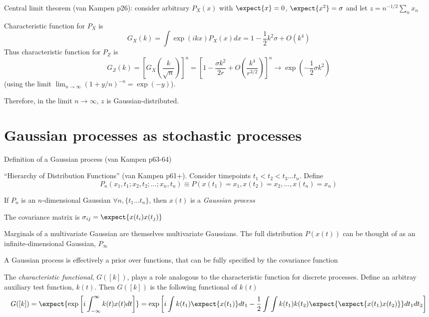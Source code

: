 \documentclass{beamer}
\begin{document}
\begin{frame}{}
Central limit theorem (van Kampen p26):
consider arbitrary $P_X(x)$ with $\expect{x} = 0$, $\expect{x^2} = \sigma$
and let $z = n^{-1/2} \sum_n x_n$

Characteristic function for $P_X$ is
\[
G_X(k) = \int \exp(ikx) P_X(x) dx = 1 - \frac{1}{2} k^2 \sigma + O(k^4)
\]
Thus characteristic function for $P_Z$ is
\[
G_Z(k) = \left[ G_X \left( \frac{k}{\sqrt{n}} \right) \right]^n
 = \left[ 1 - \frac{\sigma k^2}{2r} + O \left( \frac{k^4}{r^{3/2}} \right) \right]^n
 \to \exp(-\frac{1}{2} \sigma k^2)
\]
(using the limit $\lim_{n \to \infty} (1+y/n)^{-n} = \exp(-y)$).

Therefore, in the limit $n \to \infty$, $z$ is Gaussian-distributed.

\end{frame}


\section{Gaussian processes as stochastic processes}

\begin{frame}{}

\itemb
\item Definition of a Gaussian process (van Kampen p63-64)
 \itemb
 \item ``Hierarchy of Distribution Functions'' (van Kampen p61+). Consider timepoints $t_1 < t_2 < t_3 \ldots t_n$. Define
\[
P_n(x_1,t_1;x_2,t_2;\ldots;x_n,t_n) \equiv P(x(t_1) = x_1, x(t_2) = x_2, \ldots, x(t_n) = x_n)
\]
 \item If $P_n$ is an $n$-dimensional Gaussian $\forall n, \{ t_1 \ldots t_n \}$, then $x(t)$ is a {\em Gaussian process}
 \item The covariance matrix is $\sigma_{ij} = \expect{x(t_i) x(t_j)}$
 \item Marginals of a multivariate Gaussian are themselves multivariate Gaussians.
The full distribution $P(x(t))$ can be thought of as an infinite-dimensional Gaussian, $P_\infty$
 \item A Gaussian process is effectively a prior over functions, that can be fully specified by the covariance function
 \iteme
\iteme

\end{frame}

\begin{frame}{}

\itemb
 \item The {\em characteristic functional}, $G([k])$, plays a role analogous to the characteristic function for discrete processes.
Define an arbitray auxiliary test function, $k(t)$. Then $G([k])$ is the following functional of $k(t)$
\[
G([k]) = \expect{\exp \left[ i \int_{-\infty}^{\infty} k(t) x(t) dt \right]}
= \exp \left[ i\int k(t_1) \expect{x(t_1)} dt_1 - \frac{1}{2} \int \int k(t_1)k(t_2) \expect{\expect{x(t_1)x(t_2)}} dt_1 dt_2 \right]
\]
\iteme

\end{frame}
\end{document}

